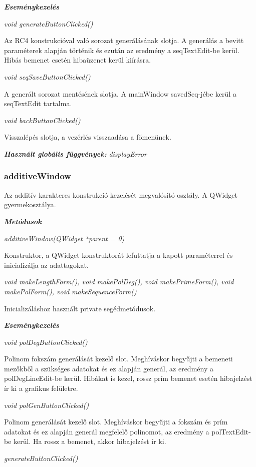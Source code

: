\documentclass[12pt]{article}
\begin{document}
\textit{\textbf{Eseménykezelés}}

\textit{void generateButtonClicked()}

Az RC4 konstrukcióval való sorozat generálásának slotja. A generálás a bevitt paraméterek alapján történik és ezután az eredmény a seqTextEdit-be kerül. Hibás bemenet esetén hibaüzenet kerül kiírásra.

\textit{void seqSaveButtonClicked()}

A generált sorozat mentésének slotja. A mainWindow savedSeq-jébe kerül a seqTextEdit tartalma.

\textit{void backButtonClicked()}

Visszalépés slotja, a vezérlés visszaadása a főmenünek.

\textit{\textbf{Használt globális függvények: }}\textit{displayError}

\subsubsection*{additiveWindow}

Az additív karakteres konstrukció kezelését megvalósító osztály. A QWidget gyermekosztálya.

\textbf{\textit{Metódusok}}

\textit{additiveWindow(QWidget *parent = 0)}

Konstruktor, a QWidget konstruktorát lefuttatja a kapott paraméterrel és inicializálja az adattagokat.

\textit{void makeLengthForm(), void makePolDeg(), void makePrimeForm(), void makePolForm(), void makeSequenceForm()}

Inicializáláshoz használt private segédmetódusok.

\textbf{\textit{Eseménykezelés}}

\textit{void polDegButtonClicked()}

Polinom fokszám generálását kezelő slot. Meghíváskor begyűjti a bemeneti mezőkből a szükséges adatokat és ez alapján generál, az eredmény a polDegLineEdit-be kerül.
Hibákat is kezel, rossz prím bemenet esetén hibajelzést ír ki a grafikus felületre.

\textit{void polGenButtonClicked()}

Polinom generálását kezelő slot. Meghíváskor begyűjti a fokszám és prím adatokat és ez alapján generál megfelelő polinomot, az eredmény a polTextEdit-be kerül. Ha rossz a bemenet, akkor hibajelzést ír ki.

\textit{generateButtonClicked()}
\end{document}
